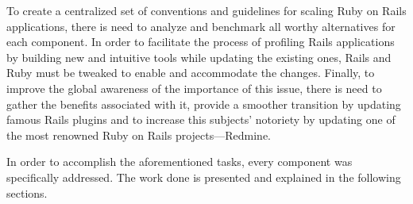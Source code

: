 To create a centralized set of conventions and guidelines for scaling Ruby on Rails applications, there is need to analyze and benchmark all worthy alternatives for each component. In order to facilitate the process of profiling Rails applications by building new and intuitive tools while updating the existing ones, Rails and Ruby must be tweaked to enable and accommodate the changes. Finally, to improve the global awareness of the importance of this issue, there is need to gather the benefits associated with it, provide a smoother transition by updating famous Rails plugins and to increase this subjects' notoriety by updating one of the most renowned Ruby on Rails projects---Redmine.

In order to accomplish the aforementioned tasks, every component was specifically addressed. The work done is presented and explained in the following sections.







